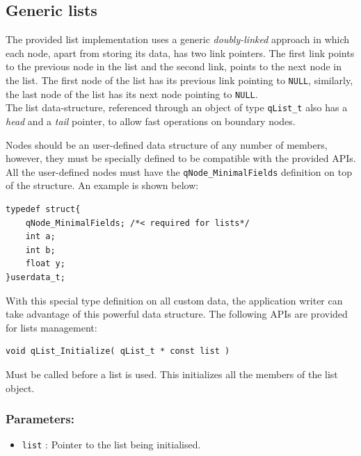\documentclass{article}
\begin{document}
\subsection{Generic lists} \label{qlist}
The provided list implementation uses a generic \textit{doubly-linked} approach in which each node, apart from storing its data, has two link pointers. The first link points to the previous node in the list and the second link, points to the next node in the list. The first node of the list has its previous link pointing to \lstinline{NULL}, similarly, the last node of the list has its next node pointing to \lstinline{NULL}. \\
The list data-structure, referenced through an object of type \lstinline{qList_t}  also has a \textit{head} and a \textit{tail} pointer, to allow fast operations on boundary nodes.



Nodes should be an user-defined data structure of any number of members, however, they must be specially defined to be compatible with the provided APIs. All the user-defined nodes must have the \lstinline{qNode_MinimalFields} definition on top of the structure. An example is shown below: \\

\begin{lstlisting}[style=CStyle]
typedef struct{
    qNode_MinimalFields; /*< required for lists*/
    int a;
    int b;
    float y;
}userdata_t;
\end{lstlisting}

With this special type definition on all custom data, the application writer can take advantage of this powerful data structure. The following APIs are provided for lists management:

\noindent\hrulefill


\begin{lstlisting}[style=CStyle]
void qList_Initialize( qList_t * const list )
\end{lstlisting}

Must be called before a list is used.  This initializes all the members of the 
list object. 

\subsubsection*{Parameters:}
\begin{itemize}
    \item \lstinline{list} : Pointer to the list being initialised. 
\end{itemize}
\end{document}
